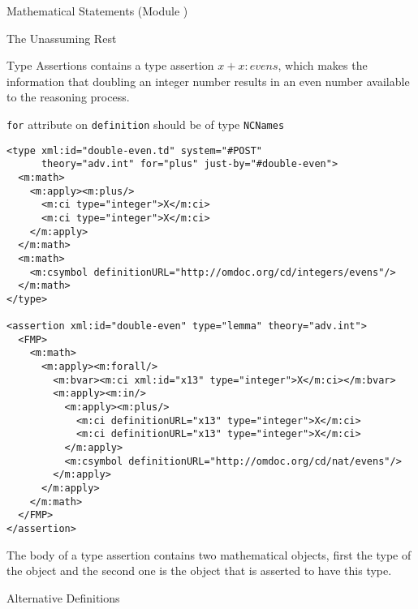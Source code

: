 \begin{tchapter}[id=statements,short=Mathematical Statements]{Mathematical Statements (Module {})}
\begin{tsection}[id=assertion]{The Unassuming Rest}
\begin{tsubsection}[id=type-assertions]{Type Assertions}
  {} contains a type assertion $x+x\colon evens$, which makes
  the information that doubling an integer number results in an even number available to
  the reasoning process.

\begin{erratum}[reported-by=Michael Kohlhase,date=2009-08-11]{{\texttt{for}} attribute on
    {\texttt{definition}} should be of type {\texttt{NCNames}}}
\begin{lstlisting}[label=lst:term-declaration,
  caption={A Term declaration in {\omdoc}.},
  index={type,assertion}]
<type xml:id="double-even.td" system="#POST" 
      theory="adv.int" for="plus" just-by="#double-even">
  <m:math>
    <m:apply><m:plus/>
      <m:ci type="integer">X</m:ci>
      <m:ci type="integer">X</m:ci>
    </m:apply>
  </m:math>
  <m:math>
    <m:csymbol definitionURL="http://omdoc.org/cd/integers/evens"/>
  </m:math>
</type>

<assertion xml:id="double-even" type="lemma" theory="adv.int">
  <FMP>
    <m:math>
      <m:apply><m:forall/>
        <m:bvar><m:ci xml:id="x13" type="integer">X</m:ci></m:bvar>
        <m:apply><m:in/>
          <m:apply><m:plus/>
            <m:ci definitionURL="x13" type="integer">X</m:ci>
            <m:ci definitionURL="x13" type="integer">X</m:ci>
          </m:apply>
          <m:csymbol definitionURL="http://omdoc.org/cd/nat/evens"/>
        </m:apply>
      </m:apply>
    </m:math>
  </FMP>
</assertion>
\end{lstlisting}
\end{erratum}
The body of a type assertion contains two mathematical objects, first the type of
the object and the second one is the object that is asserted to have this
type.
\end{tsubsection}

\begin{tsubsection}[id=alternative]{Alternative Definitions}
  

\end{tsubsection}
\end{tsection}
\end{tchapter}
